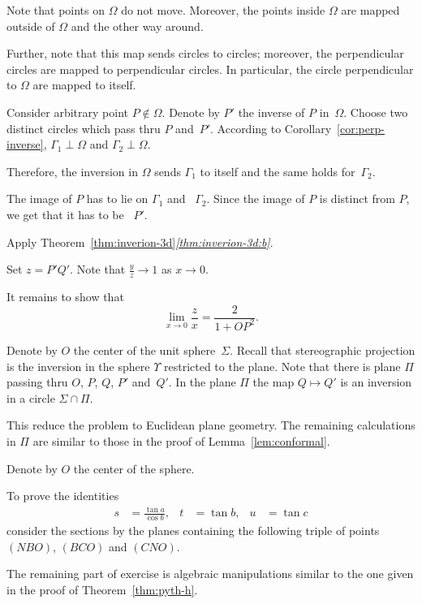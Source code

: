 Note that points on $\Omega$ do not move.
Moreover, the points inside $\Omega$ 
are mapped outside of $\Omega$ and the other way around.

Further, note that this map sends circles to circles;
moreover, the perpendicular circles are mapped to perpendicular circles.
In particular, the circle perpendicular to $\Omega$ are mapped to itself.

Consider arbitrary point $P\notin\Omega$.
Denote by $P'$ the inverse of $P$ in~$\Omega$.
Choose two distinct circles which pass thru $P$ and~$P'$.
According to Corollary~\ref{cor:perp-inverse}, 
$\Gamma_1\perp \Omega$ and $\Gamma_2\perp \Omega$.

Therefore, the inversion in $\Omega$ sends $\Gamma_1$ to itself and the same holds for~$\Gamma_2$. 

The image of $P$ has to lie on $\Gamma_1$ and ~$\Gamma_2$.
Since the image of $P$ is distinct from $P$, we get that it has to be ~$P'$.

Apply Theorem~\ref{thm:inverion-3d}\textit{\ref{thm:inverion-3d:b}}.

Set $z=P'Q'$.
Note that $\tfrac yz\to 1$ as $x\to 0$.

It remains to show that 
$$\lim_{x\to 0} \frac{z}{x}=\frac{2}{1+OP^2}.$$

Denote by $O$ the center of the unit sphere~$\Sigma$.
Recall that stereographic projection is the inversion in the sphere $\Upsilon$ restricted to the plane.
Note that there is plane $\Pi$ passing thru $O$, $P$, $Q$, $P'$ and~$Q'$.
In the plane $\Pi$ the map $Q\mapsto Q'$ is an inversion in a circle $\Sigma\cap \Pi$.

This reduce the problem to Euclidean plane geometry.
The remaining calculations in $\Pi$ are similar to those in the proof of  Lemma~\ref{lem:conformal}.



Denote by $O$ the center of the sphere.

To prove the identities
\begin{align*}
s&=\tfrac{\tan a}{\cos b},
&
t&=\tan b,
&
u&=\tan c
\end{align*}
consider the sections by the planes containing the following triple of points $(NBO)$, $(BCO)$ and $(CNO)$.

The remaining part of exercise is algebraic manipulations similar to the one given in the proof of Theorem~\ref{thm:pyth-h}.

